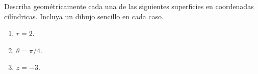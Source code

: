 Describa geométricamente cada una de las siguientes superficies en coordenadas cilíndricas. Incluya un dibujo sencillo en cada caso.
\begin{enumerate}
    \item $r=2$.
    \item $\theta=\pi/4$.
    \item $z=-3$.
\end{enumerate}
